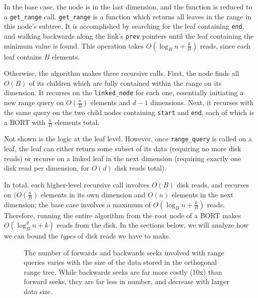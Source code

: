 \documentclass[11pt, oneside]{article}
\newcommand{\ms}{\texttt}
\begin{document}
In the base case, the node is in the last dimension, and the function is reduced
to a \ms{get\_range} call. \ms{get\_range} is a function which returns all
leaves in the range in this node's subtree. It is accomplished by searching for
the leaf containing \ms{end}, and walking backwards along the link's \ms{prev}
pointers until the leaf containing the minimum value is found. This operation
takes $O(\log_B n + \frac{k}{B})$ reads, since each leaf contains $B$ elements.

Otherwise, the algorithm makes three recursive calls. First, the node finds all
$O(B)$ of its children which are fully contained within the range on its
dimension. It recurses on the \ms{linked\_node} for each one, essentially
initiating a new range query on $O(\frac{n}{B})$ elements and $d - 1$
dimensions. Next, it recurses with the same query on the two child nodes
containing \ms{start} and \ms{end}, each of which is a BORT with $\frac{n}{B}$
elements total.

Not shown is the logic at the leaf level. However, once \ms{range\_query} is
called on a leaf, the leaf can either return some subset of its data (requiring
no more disk reads) or recurse on a linked leaf in the next dimension (requiring
exactly one disk read per dimension, for $O(d)$ disk reads total).

In total, each higher-level recursive call involves $O(B)$ disk reads, and
recurses on $(O(\frac{n}{B})$ elements in its own dimension and $O(n)$ elements
in the next dimension; the base case involves a maximum of $O(\log_B n +
\frac{k}{B})$ reads. Therefore, running the entire algorithm from the root node
of a BORT makes $O(\log_B^d n + k)$ reads from the disk. In the sections below,
we will analyze how we can bound the \textit{types} of disk reads we have to
make.

\begin{figure}[b!]
\centering
{}%
\caption{
    The number of forwards and backwards seeks involved with range queries varies with the size of the data stored in the orthogonal range tree. While backwards seeks are far more costly (10x) than forward seeks, they are far less in number, and decrease with larger data size.
}
\label{fig:figure2}
\end{figure}
\end{document}
